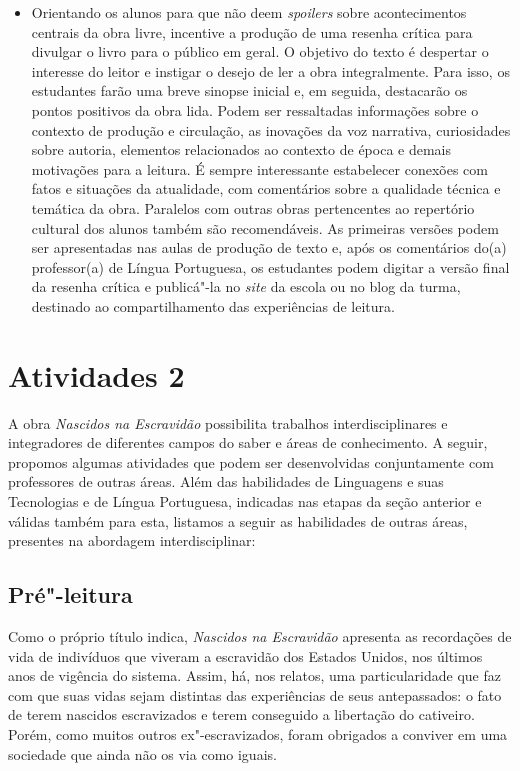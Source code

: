 \documentclass[11pt]{extarticle}
\begin{document}
\begin{itemize}
\item
  Orientando os alunos para que não deem \emph{spoilers} sobre
  acontecimentos centrais da obra livre, incentive a produção de uma
  resenha crítica para divulgar o livro para o público em geral. O
  objetivo do texto é despertar o interesse do leitor e instigar o
  desejo de ler a obra integralmente. Para isso, os estudantes farão uma
  breve sinopse inicial e, em seguida, destacarão os pontos positivos da
  obra lida. Podem ser ressaltadas informações sobre o contexto de
  produção e circulação, as inovações da voz narrativa, curiosidades
  sobre autoria, elementos relacionados ao contexto de época e demais
  motivações para a leitura. É sempre interessante estabelecer conexões
  com fatos e situações da atualidade, com comentários sobre a qualidade
  técnica e temática da obra. Paralelos com outras obras pertencentes ao
  repertório cultural dos alunos também são recomendáveis. As primeiras
  versões podem ser apresentadas nas aulas de produção de texto e, após
  os comentários do(a) professor(a) de Língua Portuguesa, os estudantes
  podem digitar a versão final da resenha crítica e publicá"-la no
  \emph{site} da escola ou no blog da turma, destinado ao
  compartilhamento das experiências de leitura.
\end{itemize}

\section{Atividades 2}

A obra \emph{Nascidos na Escravidão} possibilita trabalhos
interdisciplinares e integradores de diferentes campos do saber e áreas
de conhecimento. A seguir, propomos algumas atividades que podem ser
desenvolvidas conjuntamente com professores de outras áreas. Além das
habilidades de Linguagens e suas Tecnologias e de Língua Portuguesa,
indicadas nas etapas da seção anterior e válidas também para esta,
listamos a seguir as habilidades de outras áreas, presentes na abordagem
interdisciplinar:

\subsection{Pré"-leitura}


Como o próprio título indica, \emph{Nascidos na Escravidão}
apresenta as recordações de vida de indivíduos que viveram a escravidão
dos Estados Unidos, nos últimos anos de vigência do sistema. Assim, há,
nos relatos, uma particularidade que faz com que suas vidas sejam
distintas das experiências de seus antepassados: o fato de terem
nascidos escravizados e terem conseguido a libertação do cativeiro.
Porém, como muitos outros ex"-escravizados, foram obrigados a conviver em
uma sociedade que ainda não os via como iguais.
\end{document}
